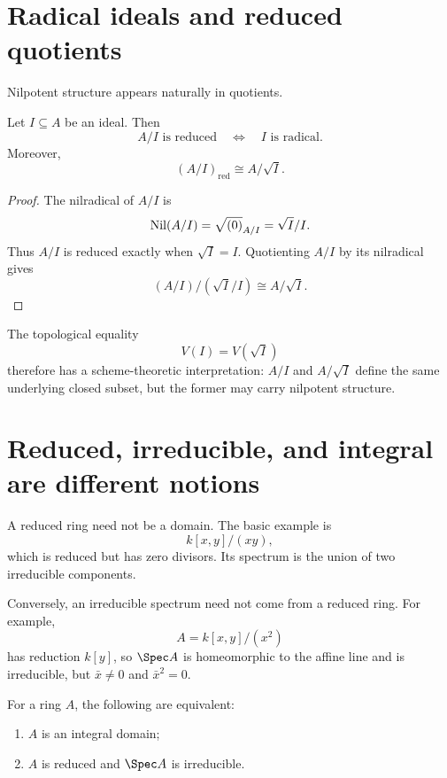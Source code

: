 \section{Radical ideals and reduced quotients}

Nilpotent structure appears naturally in quotients.

\begin{theorem}
Let $I\subseteq A$ be an ideal.  Then
\[
A/I\text{ is reduced}
\quad\Longleftrightarrow\quad
I\text{ is radical}.
\]
Moreover,
\[
(A/I)_{\mathrm{red}}\cong A/\sqrt I.
\]
\end{theorem}

\begin{proof}
The nilradical of $A/I$ is
\[
\operatorname{Nil}(A/I)=\sqrt{(0)}_{A/I}=\sqrt I/I.
\]
Thus $A/I$ is reduced exactly when $\sqrt I=I$.  Quotienting $A/I$ by its nilradical
gives
\[
(A/I)/(\sqrt I/I)\cong A/\sqrt I.
\]
\end{proof}

The topological equality
\[
V(I)=V(\sqrt I)
\]
therefore has a scheme-theoretic interpretation: $A/I$ and $A/\sqrt I$ define the same
underlying closed subset, but the former may carry nilpotent structure.



\section{Reduced, irreducible, and integral are different notions}

A reduced ring need not be a domain.  The basic example is
\[
k[x,y]/(xy),
\]
which is reduced but has zero divisors.  Its spectrum is the union of two irreducible
components.

Conversely, an irreducible spectrum need not come from a reduced ring.  For example,
\[
A=k[x,y]/(x^2)
\]
has reduction $k[y]$, so $\Spec A$ is homeomorphic to the affine line and is irreducible,
but $\bar x\neq0$ and $\bar x^2=0$.

\begin{theorem}
For a ring $A$, the following are equivalent:
\begin{enumerate}
\item $A$ is an integral domain;
\item $A$ is reduced and $\Spec A$ is irreducible.
\end{enumerate}
\end{theorem}


